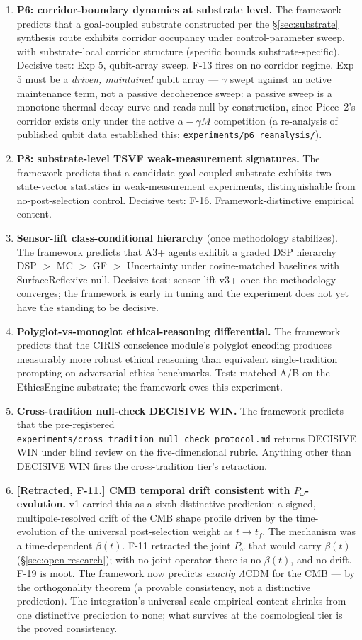 \documentclass[11pt,a4paper]{article}
\newcommand{\Pomega}{P_{\omega}}
\begin{document}
\begin{enumerate}[leftmargin=*,itemsep=4pt]
\item \textbf{P6: corridor-boundary dynamics at substrate level.} The framework predicts that a goal-coupled substrate constructed per the \S\ref{sec:substrate} synthesis route exhibits corridor occupancy under control-parameter sweep, with substrate-local corridor structure (specific bounds substrate-specific). Decisive test: Exp 5, qubit-array sweep. F-13 fires on no corridor regime. Exp 5 must be a \emph{driven, maintained} qubit array --- $\gamma$ swept against an active maintenance term, not a passive decoherence sweep: a passive sweep is a monotone thermal-decay curve and reads null by construction, since Piece~2's corridor exists only under the active $\alpha - \gamma M$ competition (a re-analysis of published qubit data established this; \texttt{experiments/p6\_reanalysis/}).
\item \textbf{P8: substrate-level TSVF weak-measurement signatures.} The framework predicts that a candidate goal-coupled substrate exhibits two-state-vector statistics in weak-measurement experiments, distinguishable from no-post-selection control. Decisive test: F-16. Framework-distinctive empirical content.
\item \textbf{Sensor-lift class-conditional hierarchy} (once methodology stabilizes). The framework predicts that A3+ agents exhibit a graded DSP hierarchy DSP $>$ MC $>$ GF $>$ Uncertainty under cosine-matched baselines with SurfaceReflexive null. Decisive test: sensor-lift v3+ once the methodology converges; the framework is early in tuning and the experiment does not yet have the standing to be decisive.
\item \textbf{Polyglot-vs-monoglot ethical-reasoning differential.} The framework predicts that the CIRIS conscience module's polyglot encoding produces measurably more robust ethical reasoning than equivalent single-tradition prompting on adversarial-ethics benchmarks. Test: matched A/B on the EthicsEngine substrate; the framework owes this experiment.
\item \textbf{Cross-tradition null-check DECISIVE WIN.} The framework predicts that the pre-registered \texttt{experiments/cross\_tradition\_null\_check\_protocol.md} returns DECISIVE WIN under blind review on the five-dimensional rubric. Anything other than DECISIVE WIN fires the cross-tradition tier's retraction.
\item \textbf{[Retracted, F-11.] CMB temporal drift consistent with $\Pomega$-evolution.} v1 carried this as a sixth distinctive prediction: a signed, multipole-resolved drift of the CMB shape profile driven by the time-evolution of the universal post-selection weight as $t \to t_f$. The mechanism was a time-dependent $\beta(t)$. F-11 retracted the joint $\Pomega$ that would carry $\beta(t)$ (\S\ref{sec:open-research}); with no joint operator there is no $\beta(t)$, and no drift. F-19 is moot. The framework now predicts \emph{exactly} $\Lambda$CDM for the CMB --- by the orthogonality theorem (a provable consistency, not a distinctive prediction). The integration's universal-scale empirical content shrinks from one distinctive prediction to none; what survives at the cosmological tier is the proved consistency.

\end{enumerate}
\end{document}
